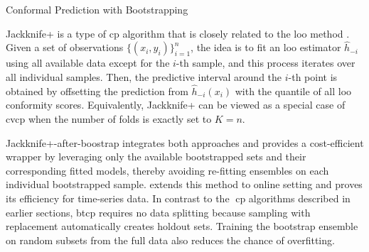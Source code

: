 \begin{algorithm}[t]
  \caption{Conformal Prediction with Bootstrapping}
  \label{alg:BtCP}
  \begin{algorithmic}[1]
    \textbf{Input:} 
    A set of observations $\{(x_{i}, y_{i})\}_{i=1}^n$, number of bootstraps $B$, a prediction algorithm $h(\cdot)$, a non-conformity measure $\myfunc{s(\cdot)}$, nominal mis-coverage rate $\tau$, test data $x_{n+1}$. \vskip
    \textbf{Output:} a prediction set $\mathcal{C}_{\tau}(x_{n+1})}$ that covers $y_{n+1}$ with probability $1-\tau$. \vskip
    \vspace{0.5em}
    \STATE Sample all available data with replacement and create $B$ subsets. $I_b$ denotes the indices of data points included in the $b$-th bootstrap set.
    \STATE Train $\hat{h}_{b}(\cdot)$ on $\{(x_{i}, y_{i}) \mid i \in I_b\}$ for $b$ in 1, 2, ..., B
    \STATE Initialise a conformity scoring set $S=\emptyset$
    \FOR {$i$ in 1, 2, ..., n}
    	\begin{enumerate}
    		\STATE Initialize an empty for leave-one-out estimates $LOO_i=\emptyset$
    		\STATE For {$b$ in 1, 2, ..., B},  if {$i$ \notin \; $I_b$}\;: $LOO_i \leftarrow{LOO_i \cup \hat{h}_b(x_i)}$ 
			\STATE S \gets S \cup s\big(aggregate(LOO_i),\; y_i\big)
		\end{enumerate}
    \ENDFOR
	\STATE Predict $x_{n+1}$: $h(x_{n+1}) \leftarrow aggregate(\{\hat{h}_{1}(x_{n+1}), ..., \hat{h}_{B}(x_{n+1})\})$ 
	\STATE Return $\mathcal{C}_{\tau}(x_{n+1}) \leftarrow \{y \,|\, s((h(x_{n+1}), y) \leq q\}$, where $q$ is the $\lceil(1-\tau)(n_s+1)\rceil$-th smallest value of $S$, with $n_s = |S|$.
    \end{algorithmic}
\end{algorithm}

Jackknife+ is a type of \gls{cp} algorithm that is closely related to the \gls{loo} method \cite{barber2020jackknife}. Given a set of observations $\{(x_{i}, y_{i})\}_{i=1}^n$, the idea is to fit an \gls{loo} estimator $\hat{h}_{-i}$ using all available data except for the $i$-th sample, and this process iterates over all individual samples. Then, the predictive interval around the $i$-th point is obtained by offsetting the prediction from $\hat{h}_{-i}(x_i)$ with the quantile of all \gls{loo} conformity scores.  Equivalently, Jackknife+ can be viewed as a special case of \gls{cvcp} when the number of folds is exactly set to $K=n$.

Jackknife+-after-boostrap \cite{kim2020predictive} integrates both approaches and provides a cost-efficient wrapper by leveraging only the available bootstrapped sets and their corresponding fitted models, thereby avoiding re-fitting ensembles on each individual bootstrapped sample. \cite{pmlr-v139-xu21h} extends this method to online setting and proves its efficiency for time-series data. In contrast to the \gls{cp} algorithms described in earlier sections, \gls{btcp} requires no data splitting because sampling with replacement automatically creates holdout sets. Training the bootstrap ensemble on random subsets from the full data also reduces the chance of overfitting.

